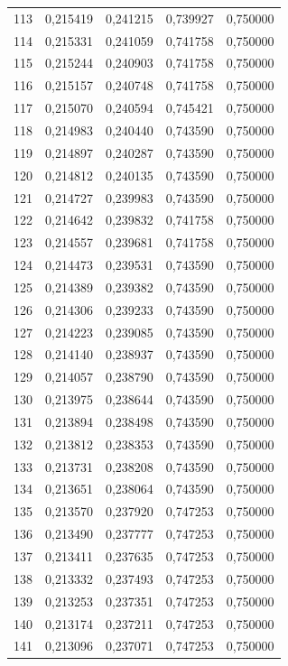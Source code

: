 \begin{tabular}{lrrrr}
113 & 0,215419 & 0,241215 & 0,739927 & 0,750000 \\
114 & 0,215331 & 0,241059 & 0,741758 & 0,750000 \\
115 & 0,215244 & 0,240903 & 0,741758 & 0,750000 \\
116 & 0,215157 & 0,240748 & 0,741758 & 0,750000 \\
117 & 0,215070 & 0,240594 & 0,745421 & 0,750000 \\
118 & 0,214983 & 0,240440 & 0,743590 & 0,750000 \\
119 & 0,214897 & 0,240287 & 0,743590 & 0,750000 \\
120 & 0,214812 & 0,240135 & 0,743590 & 0,750000 \\
121 & 0,214727 & 0,239983 & 0,743590 & 0,750000 \\
122 & 0,214642 & 0,239832 & 0,741758 & 0,750000 \\
123 & 0,214557 & 0,239681 & 0,741758 & 0,750000 \\
124 & 0,214473 & 0,239531 & 0,743590 & 0,750000 \\
125 & 0,214389 & 0,239382 & 0,743590 & 0,750000 \\
126 & 0,214306 & 0,239233 & 0,743590 & 0,750000 \\
127 & 0,214223 & 0,239085 & 0,743590 & 0,750000 \\
128 & 0,214140 & 0,238937 & 0,743590 & 0,750000 \\
129 & 0,214057 & 0,238790 & 0,743590 & 0,750000 \\
130 & 0,213975 & 0,238644 & 0,743590 & 0,750000 \\
131 & 0,213894 & 0,238498 & 0,743590 & 0,750000 \\
132 & 0,213812 & 0,238353 & 0,743590 & 0,750000 \\
133 & 0,213731 & 0,238208 & 0,743590 & 0,750000 \\
134 & 0,213651 & 0,238064 & 0,743590 & 0,750000 \\
135 & 0,213570 & 0,237920 & 0,747253 & 0,750000 \\
136 & 0,213490 & 0,237777 & 0,747253 & 0,750000 \\
137 & 0,213411 & 0,237635 & 0,747253 & 0,750000 \\
138 & 0,213332 & 0,237493 & 0,747253 & 0,750000 \\
139 & 0,213253 & 0,237351 & 0,747253 & 0,750000 \\
140 & 0,213174 & 0,237211 & 0,747253 & 0,750000 \\
141 & 0,213096 & 0,237071 & 0,747253 & 0,750000 \\

\end{tabular}
